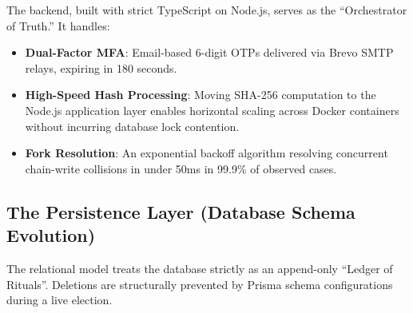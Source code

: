 \documentclass[journal,10pt,twocolumn]{IEEEtran}
\begin{document}
The backend, built with strict TypeScript on Node.js, serves as the ``Orchestrator of Truth.'' It handles:
\begin{itemize}
    \item \textbf{Dual-Factor MFA}: Email-based 6-digit OTPs delivered via Brevo SMTP relays, expiring in 180 seconds.
    \item \textbf{High-Speed Hash Processing}: Moving SHA-256 computation to the Node.js application layer enables horizontal scaling across Docker containers without incurring database lock contention.
    \item \textbf{Fork Resolution}: An exponential backoff algorithm resolving concurrent chain-write collisions in under 50ms in 99.9\% of observed cases.
\end{itemize}

\subsection{The Persistence Layer (Database Schema Evolution)}

The relational model treats the database strictly as an append-only ``Ledger of Rituals''. Deletions are structurally prevented by Prisma schema configurations during a live election.
\end{document}
